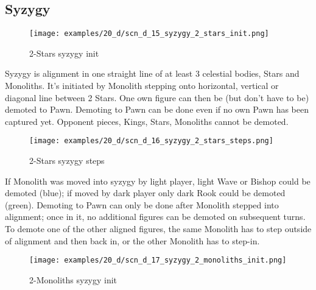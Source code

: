 \subsection*{Syzygy}

\vspace*{-1.2\baselineskip}
\noindent
\begin{figure}[!h]
\texttt{[image: examples/20\_d/scn\_d\_15\_syzygy\_2\_stars\_init.png]}
\caption{2-Stars syzygy init}
\label{fig:scn_d_15_syzygy_2_stars_init}
\end{figure}

Syzygy is alignment in one straight line of at least 3 celestial bodies, Stars and Monoliths. It's initiated by
Monolith stepping onto horizontal, vertical or diagonal line between 2 Stars. One own figure can then be (but
don't have to be) demoted to Pawn. Demoting to Pawn can be done even if no own Pawn has been captured yet.
Opponent pieces, Kings, Stars, Monoliths cannot be demoted.

\clearpage %

\noindent
\begin{figure}[!h]
\texttt{[image: examples/20\_d/scn\_d\_16\_syzygy\_2\_stars\_steps.png]}
\caption{2-Stars syzygy steps}
\label{fig:scn_d_16_syzygy_2_stars_steps}
\end{figure}

If Monolith was moved into syzygy by light player, light Wave or Bishop could be demoted (blue); if moved by dark
player only dark Rook could be demoted (green). Demoting to Pawn can only be done after Monolith stepped into
alignment; once in it, no additional figures can be demoted on subsequent turns. To demote one of the other aligned
figures, the same Monolith has to step outside of alignment and then back in, or the other Monolith has to step-in.

\clearpage %

\noindent
\begin{figure}[!h]
\texttt{[image: examples/20\_d/scn\_d\_17\_syzygy\_2\_monoliths\_init.png]}
\caption{2-Monoliths syzygy init}
\label{fig:scn_d_17_syzygy_2_monoliths_init}
\end{figure}

